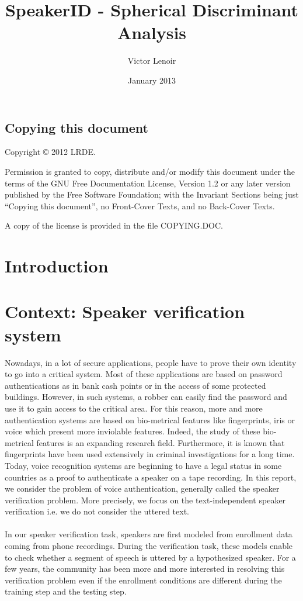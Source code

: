 \documentclass{techrep}
\title{SpeakerID - Spherical Discriminant Analysis}
\author{Victor Lenoir} \revision$LastChangedRevision: 2340 $
\date{January 2013} \email{lenoir@lrde.epita.fr}
\begin{document}
\section*{Copying this document}
Copyright \copyright{} 2012 LRDE.

Permission is granted to copy, distribute and/or modify this document
under the terms of the GNU Free Documentation License, Version 1.2 or
any later version published by the Free Software Foundation; with the
Invariant Sections being just ``Copying this document'', no
Front-Cover Texts, and no Back-Cover Texts.

A copy of the license is provided in the file COPYING.DOC.

\tableofcontents

\newpage

\chapter*{Introduction}
\chapter{Context: Speaker verification system}

Nowadays, in a lot of secure applications, people have to prove their
own identity to go into a critical system. Most of these applications
are based on password authentications as in bank cash points or in the
access of some protected buildings. However, in such systems, a robber
can easily find the password and use it to gain access to the critical
area. For this reason, more and more authentication systems are based
on bio-metrical features like fingerprints, iris or voice which present
more inviolable features. Indeed, the study of these bio-metrical
features is an expanding research field. Furthermore, it is known that
fingerprints have been used extensively in criminal investigations for
a long time. Today, voice recognition systems are beginning to have a
legal status in some countries as a proof to authenticate a speaker on
a tape recording.  In this report, we consider the problem of voice
authentication, generally called the speaker verification
problem. More precisely, we focus on the text-independent speaker
verification i.e. we do not consider the uttered text.\\\\ In our
speaker verification task, speakers are first modeled from enrollment
data coming from phone recordings. During the verification task, these
models enable to check whether a segment of speech is uttered by a
hypothesized speaker. For a few years, the community has been more and
more interested in resolving this verification problem even if the
enrollment conditions are different during the training step and the
testing step.
\end{document}
